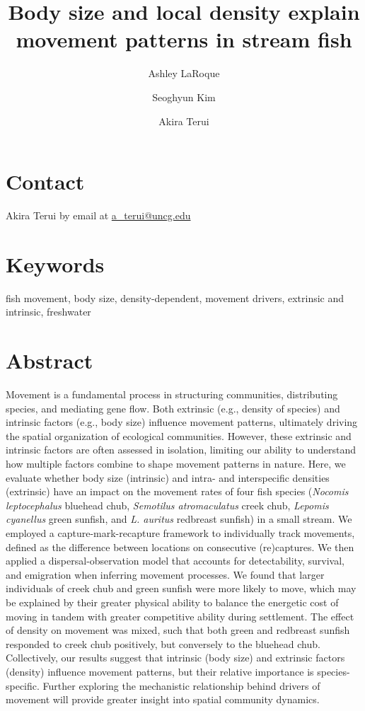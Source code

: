 \documentclass[11pt, class=article, crop=false]{standalone}
\date{} %
\title{Body size and local density explain movement patterns in stream fish}
\date{} %
\author[1]{Ashley LaRoque}
\author[1, 2]{Seoghyun Kim}
\author[1]{Akira Terui}
\affil[1]{Depatment of Biology, University of North Carolina at Greensboro}
\affil[2]{Department of Biological Sciences, Kangwon National University}
\begin{document}
\maketitle
\thispagestyle{empty}

\section*{Contact}
Akira Terui by email at \url{a_terui@uncg.edu}

\newpage
\thispagestyle{empty}

\section*{Keywords}

fish movement, body size, density-dependent, movement drivers, extrinsic and intrinsic, freshwater

\section*{Abstract}

 Movement is a fundamental process in structuring communities, distributing species, and mediating gene flow. Both extrinsic (e.g., density of species) and intrinsic factors (e.g., body size) influence movement patterns, ultimately driving the spatial organization of ecological communities. However, these extrinsic and intrinsic factors are often assessed in isolation, limiting our ability to understand how multiple factors combine to shape movement patterns in nature. Here, we evaluate whether body size (intrinsic) and intra- and interspecific densities (extrinsic) have an impact on the movement rates of four fish species (\textit{Nocomis leptocephalus} bluehead chub, \textit{Semotilus atromaculatus} creek chub, \textit{Lepomis cyanellus} green sunfish, and \textit{L. auritus} redbreast sunfish) in a small stream. We employed a capture-mark-recapture framework to individually track movements, defined as the difference between locations on consecutive (re)captures. We then applied a dispersal-observation model that accounts for detectability, survival, and emigration when inferring movement processes. We found that larger individuals of creek chub and green sunfish were more likely to move, which may be explained by their greater physical ability to balance the energetic cost of moving in tandem with greater competitive ability during settlement. The effect of density on movement was mixed, such that both green and redbreast sunfish responded to creek chub positively, but conversely to the bluehead chub. Collectively, our results suggest that intrinsic (body size) and extrinsic factors (density) influence movement patterns, but their relative importance is species-specific. Further exploring the mechanistic relationship behind drivers of movement will provide greater insight into spatial community dynamics.
\end{document}
